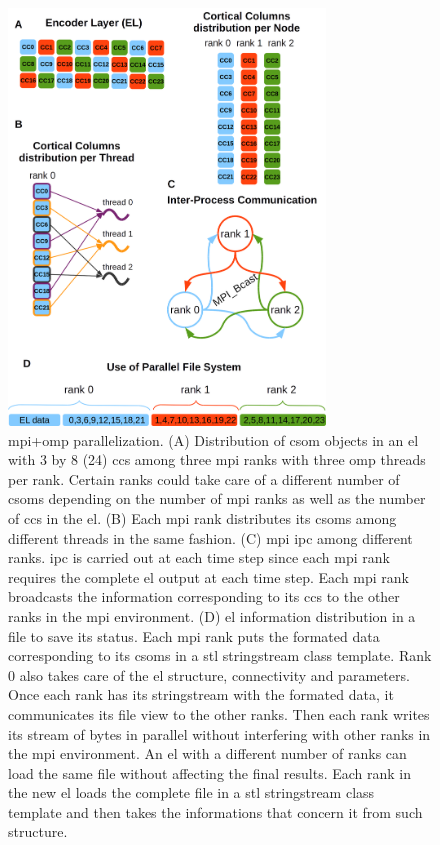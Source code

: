 \documentclass{book}
\begin{document}
\begin{appendices}
\begin{figure}[h!]
    \centering
    \includegraphics[width=0.75\textwidth]{EncoderParallelization.png}
    \caption{ \gls{mpi}+\gls{omp} parallelization. (A) Distribution of \gls{csom} objects in an \gls{el} with
    3 by 8 (24) \glspl{cc} among three \gls{mpi} ranks with three \gls{omp} threads per rank.
    Certain ranks could take care of a different number of
    \glspl{csom} depending on the number of \gls{mpi} ranks as well as the number of \glspl{cc} in the \gls{el}.
    (B) Each \gls{mpi} rank distributes its \glspl{csom} among different threads in the same fashion.
    (C) \gls{mpi} \gls{ipc} among different ranks. \gls{ipc} is carried out at each time step since each \gls{mpi} rank 
    requires the complete \gls{el} output at each time step.
    Each \gls{mpi} rank broadcasts the information corresponding to its \glspl{cc} to the other ranks in the \gls{mpi}
    environment.
    (D) \gls{el} information distribution in a file to save its status.
    Each \gls{mpi} rank puts the formated data corresponding to its \glspl{csom} in a \gls{stl} stringstream class template.
    Rank 0 also takes care of the \gls{el} structure, connectivity and parameters.
    Once each rank has its stringstream with the formated data, it communicates its file view to the other ranks.
    Then each rank writes its stream of bytes in parallel without interfering with other ranks in the \gls{mpi} environment.
    An \gls{el} with a different number of ranks can load the same file without affecting the final results.
    Each rank in the new \gls{el} loads the complete file in a \gls{stl} stringstream class template and then takes the
    informations that concern it from such structure.}
    \label{fig:EncoderParallelization}
\end{figure}


\end{appendices}
\end{document}
